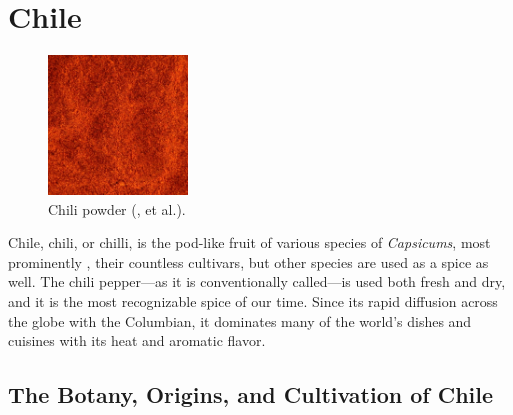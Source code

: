 \section{Chile}
\label{sec:chile}






\begin{figure}
	\vspace{-\baselineskip}
	\includegraphics[width=0.33\textwidth]{imgs/spices/chile-1.jpg}
	\caption{Chili powder (, et al.).}
	\label{fig:chile}
\end{figure}

Chile, chili, or chilli, is the pod-like fruit of various species of \textit{Capsicums}, most prominently ,  their countless \glspl{cultivar}, but other species are used as a spice as well. The chili pepper---as it is conventionally called---is used both fresh and dry, and it is the most recognizable spice of our time. Since its rapid diffusion across the globe with the \gls{Columbian}, it dominates many of the world's dishes and cuisines with its heat and aromatic flavor. 

\subsection{The Botany, Origins, and Cultivation of Chile}

